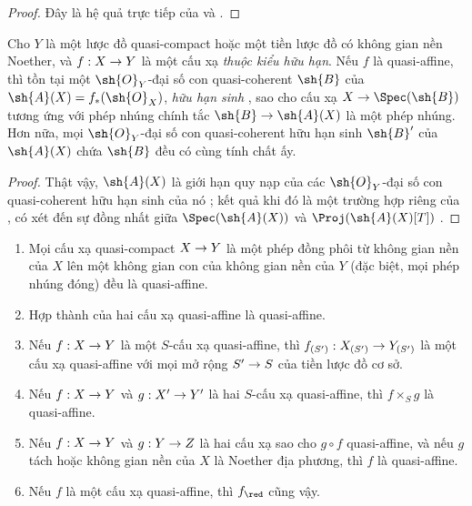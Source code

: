 \documentclass[oneside,10pt]{amsart}
\makeatletter
\newcommand{\ega@arrow}[2]{\mathchoice{#1}{#2}{#2}{#2}}
\renewcommand{\to}{\ega@arrow{\longrightarrow}{\rightarrow}}
\let\EGAOriginalLabel\label
\renewcommand{\label}[1]{\phantomsection\EGAOriginalLabel{#1}}
\makeatother
\begin{document}
\begin{proof}
Đây là hệ quả trực tiếp của  và .
\end{proof}

\begin{corollary}[5.1.9]
\label{II.5.1.9}
Cho $Y$ là một lược đồ quasi-compact hoặc một tiền lược đồ có không gian nền Noether, và $f:X\to Y$ là một cấu xạ \emph{thuộc kiểu hữu hạn}.
Nếu $f$ là quasi-affine, thì tồn tại một $\sh{O}_Y$-đại số con quasi-coherent $\sh{B}$ của $\sh{A}(X)=f_*(\sh{O}_X)$, \emph{hữu hạn sinh} , sao cho cấu xạ $X\to\Spec(\sh{B})$ tương ứng với phép nhúng chính tắc $\sh{B}\to\sh{A}(X)$  là một phép nhúng.
Hơn nữa, mọi $\sh{O}_Y$-đại số con quasi-coherent hữu hạn sinh $\sh{B}'$ của $\sh{A}(X)$ chứa $\sh{B}$ đều có cùng tính chất ấy.
\end{corollary}

\begin{proof}
Thật vậy, $\sh{A}(X)$ là giới hạn quy nạp của các $\sh{O}_Y$-đại số con quasi-coherent hữu hạn sinh của nó ;
kết quả khi đó là một trường hợp riêng của , có xét đến sự đồng nhất giữa $\Spec(\sh{A}(X))$ và $\Proj(\sh{A}(X)[T])$ .
\end{proof}

\begin{proposition}[5.1.10]
\label{II.5.1.10}
\medskip\noindent
\begin{enumerate}
  \item[{\rm(i)}] Mọi cấu xạ quasi-compact $X\to Y$ là một phép đồng phôi từ không gian nền của $X$ lên một không gian con của không gian nền của $Y$ (đặc biệt, mọi phép nhúng đóng) đều là quasi-affine.
  \item[{\rm(ii)}] Hợp thành của hai cấu xạ quasi-affine là quasi-affine.
  \item[{\rm(iii)}] Nếu $f:X\to Y$ là một $S$-cấu xạ quasi-affine, thì $f_{(S')}:X_{(S')}\to Y_{(S')}$ là một cấu xạ quasi-affine với mọi mở rộng $S'\to S$ của tiền lược đồ cơ sở.
  \item[{\rm(iv)}] Nếu $f:X\to Y$ và $g:X'\to Y'$ là hai $S$-cấu xạ quasi-affine, thì $f\times_S g$ là quasi-affine.
  \item[{\rm(v)}] Nếu $f:X\to Y$ và $g:Y\to Z$ là hai cấu xạ sao cho $g\circ f$ quasi-affine, và nếu $g$ tách hoặc không gian nền của $X$ là Noether địa phương, thì $f$ là quasi-affine.
  \item[{\rm(vi)}] Nếu $f$ là một cấu xạ quasi-affine, thì $f_\red$ cũng vậy.
\end{enumerate}
\end{proposition}
\end{document}
